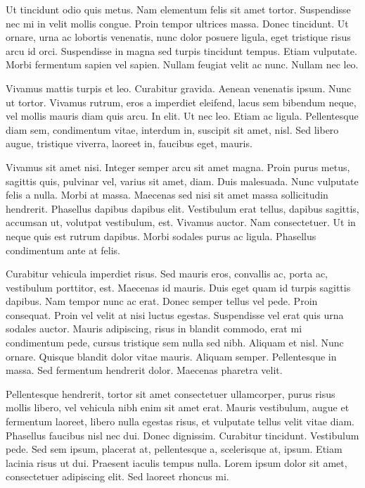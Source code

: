\documentclass[eng,printmode]{mgr}
\begin{document}
Ut tincidunt odio quis metus. Nam elementum felis sit amet tortor. Suspendisse nec mi in velit mollis congue. Proin tempor ultrices massa. Donec tincidunt. Ut ornare, urna ac lobortis venenatis, nunc dolor posuere ligula, eget tristique risus arcu id orci. Suspendisse in magna sed turpis tincidunt tempus. Etiam vulputate. Morbi fermentum sapien vel sapien. Nullam feugiat velit ac nunc. Nullam nec leo. 

Vivamus mattis turpis et leo. Curabitur gravida. Aenean venenatis ipsum. Nunc ut tortor. Vivamus rutrum, eros a imperdiet eleifend, lacus sem bibendum neque, vel mollis mauris diam quis arcu. In elit. Ut nec leo. Etiam ac ligula. Pellentesque diam sem, condimentum vitae, interdum in, suscipit sit amet, nisl. Sed libero augue, tristique viverra, laoreet in, faucibus eget, mauris. 

Vivamus sit amet nisi. Integer semper arcu sit amet magna. Proin purus metus, sagittis quis, pulvinar vel, varius sit amet, diam. Duis malesuada. Nunc vulputate felis a nulla. Morbi at massa. Maecenas sed nisi sit amet massa sollicitudin hendrerit. Phasellus dapibus dapibus elit. Vestibulum erat tellus, dapibus sagittis, accumsan ut, volutpat vestibulum, est. Vivamus auctor. Nam consectetuer. Ut in neque quis est rutrum dapibus. Morbi sodales purus ac ligula. Phasellus condimentum ante at felis. 

Curabitur vehicula imperdiet risus. Sed mauris eros, convallis ac, porta ac, vestibulum porttitor, est. Maecenas id mauris. Duis eget quam id turpis sagittis dapibus. Nam tempor nunc ac erat. Donec semper tellus vel pede. Proin consequat. Proin vel velit at nisi luctus egestas. Suspendisse vel erat quis urna sodales auctor. Mauris adipiscing, risus in blandit commodo, erat mi condimentum pede, cursus tristique sem nulla sed nibh. Aliquam et nisl. Nunc ornare. Quisque blandit dolor vitae mauris. Aliquam semper. Pellentesque in massa. Sed fermentum hendrerit dolor. Maecenas pharetra velit. 

Pellentesque hendrerit, tortor sit amet consectetuer ullamcorper, purus risus mollis libero, vel vehicula nibh enim sit amet erat. Mauris vestibulum, augue et fermentum laoreet, libero nulla egestas risus, et vulputate tellus velit vitae diam. Phasellus faucibus nisl nec dui. Donec dignissim. Curabitur tincidunt. Vestibulum pede. Sed sem ipsum, placerat at, pellentesque a, scelerisque at, ipsum. Etiam lacinia risus ut dui. Praesent iaculis tempus nulla. Lorem ipsum dolor sit amet, consectetuer adipiscing elit. Sed laoreet rhoncus mi. 
\end{document}
